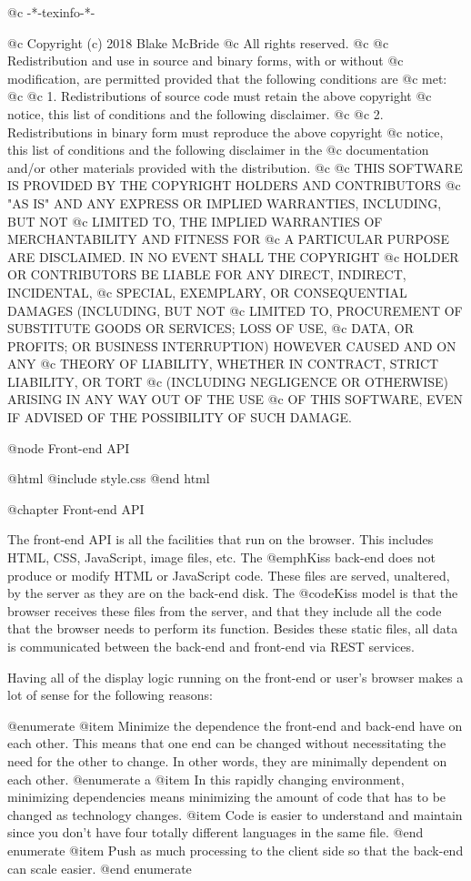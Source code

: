 @c -*-texinfo-*-

@c  Copyright (c) 2018 Blake McBride
@c  All rights reserved.
@c
@c  Redistribution and use in source and binary forms, with or without
@c  modification, are permitted provided that the following conditions are
@c  met:
@c
@c  1. Redistributions of source code must retain the above copyright
@c  notice, this list of conditions and the following disclaimer.
@c
@c  2. Redistributions in binary form must reproduce the above copyright
@c  notice, this list of conditions and the following disclaimer in the
@c  documentation and/or other materials provided with the distribution.
@c
@c  THIS SOFTWARE IS PROVIDED BY THE COPYRIGHT HOLDERS AND CONTRIBUTORS
@c  "AS IS" AND ANY EXPRESS OR IMPLIED WARRANTIES, INCLUDING, BUT NOT
@c  LIMITED TO, THE IMPLIED WARRANTIES OF MERCHANTABILITY AND FITNESS FOR
@c  A PARTICULAR PURPOSE ARE DISCLAIMED. IN NO EVENT SHALL THE COPYRIGHT
@c  HOLDER OR CONTRIBUTORS BE LIABLE FOR ANY DIRECT, INDIRECT, INCIDENTAL,
@c  SPECIAL, EXEMPLARY, OR CONSEQUENTIAL DAMAGES (INCLUDING, BUT NOT
@c  LIMITED TO, PROCUREMENT OF SUBSTITUTE GOODS OR SERVICES; LOSS OF USE,
@c  DATA, OR PROFITS; OR BUSINESS INTERRUPTION) HOWEVER CAUSED AND ON ANY
@c  THEORY OF LIABILITY, WHETHER IN CONTRACT, STRICT LIABILITY, OR TORT
@c  (INCLUDING NEGLIGENCE OR OTHERWISE) ARISING IN ANY WAY OUT OF THE USE
@c  OF THIS SOFTWARE, EVEN IF ADVISED OF THE POSSIBILITY OF SUCH DAMAGE.

@node Front-end API

@html
@include style.css
@end html

@chapter Front-end API

The front-end API is all the facilities that run on the browser.
This includes HTML, CSS, JavaScript, image files, etc.  The @emph{Kiss}
back-end does not produce or modify HTML or JavaScript code.  These
files are served, unaltered, by the server as they are on the back-end
disk.  The @code{Kiss} model is that the browser receives these files
from the server, and that they include all the code that the browser
needs to perform its function.  Besides these static files, all data
is communicated between the back-end and front-end via REST services.

Having all of the display logic running on the front-end or user's
browser makes a lot of sense for the following reasons:

@enumerate
@item
Minimize the dependence the front-end and back-end have on each other.  This means that one end can be changed without necessitating
the need for the other to change.  In other words, they are minimally dependent on each other.
@enumerate a
@item
In this rapidly changing environment, minimizing dependencies means minimizing the amount of code that has to be changed as technology changes.
@item
Code is easier to understand and maintain since you don't have four totally different languages in the same file.
@end enumerate
@item
Push as much processing to the client side so that the back-end can scale easier.
@end enumerate

